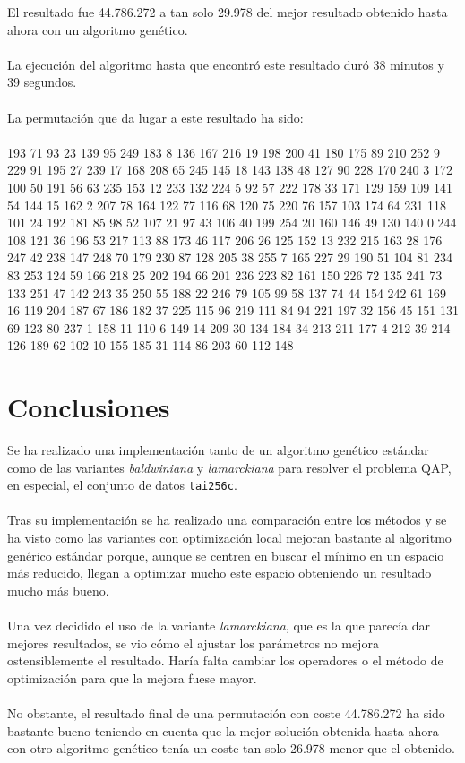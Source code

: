 El resultado fue 44.786.272 a tan solo 29.978 del mejor resultado obtenido hasta ahora con un algoritmo genético.
\\ \\
La ejecución del algoritmo hasta que encontró este resultado duró 38 minutos y 39 segundos.
\\ \\
La permutación que da lugar a este resultado ha sido: 
\\ \\
193 71 93 23 139 95 249 183 8 136 167 216 19 198 200 41 180 175 89 210 252 9 229 91 195 27 239 17 168 208 65 245 145 18 143 138 48 127 90 228 170 240 3 172 100 50 191 56 63 235 153 12 233 132 224 5 92 57 222 178 33 171 129 159 109 141 54 144 15 162 2 207 78 164 122 77 116 68 120 75 220 76 157 103 174 64 231 118 101 24 192 181 85 98 52 107 21 97 43 106 40 199 254 20 160 146 49 130 140 0 244 108 121 36 196 53 217 113 88 173 46 117 206 26 125 152 13 232 215 163 28 176 247 42 238 147 248 70 179 230 87 128 205 38 255 7 165 227 29 190 51 104 81 234 83 253 124 59 166 218 25 202 194 66 201 236 223 82 161 150 226 72 135 241 73 133 251 47 142 243 35 250 55 188 22 246 79 105 99 58 137 74 44 154 242 61 169 16 119 204 187 67 186 182 37 225 115 96 219 111 84 94 221 197 32 156 45 151 131 69 123 80 237 1 158 11 110 6 149 14 209 30 134 184 34 213 211 177 4 212 39 214 126 189 62 102 10 155 185 31 114 86 203 60 112 148

\section{Conclusiones}

Se ha realizado una implementación tanto de un algoritmo genético estándar como de las variantes \textit{baldwiniana} y \textit{lamarckiana} para resolver el problema QAP, en especial, el conjunto de datos \texttt{tai256c}.
\\ \\
Tras su implementación se ha realizado una comparación entre los métodos y se ha visto como las variantes con optimización local mejoran bastante al algoritmo genérico estándar porque, aunque se centren en buscar el mínimo en un espacio más reducido, llegan a optimizar mucho este espacio obteniendo un resultado mucho más bueno.
\\ \\
Una vez decidido el uso de la variante \textit{lamarckiana}, que es la que parecía dar mejores resultados, se vio cómo el ajustar los parámetros no mejora ostensiblemente el resultado. Haría falta cambiar los operadores o el método de optimización para que la mejora fuese mayor.
\\ \\
No obstante, el resultado final de una permutación con coste 44.786.272 ha sido bastante bueno teniendo en cuenta que la mejor solución obtenida hasta ahora con otro algoritmo genético tenía un coste tan solo 26.978 menor que el obtenido.


